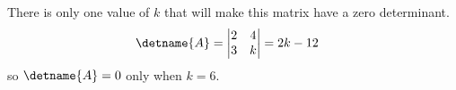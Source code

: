 There is only one value of $k$ that will make this matrix have a zero determinant.
%
\begin{align*}
\detname{A} &= \begin{vmatrix} 2 & 4 \\ 3 & k \end{vmatrix} = 2k - 12
\end{align*}
%
so $\detname{A} = 0$ only when $k = 6$.